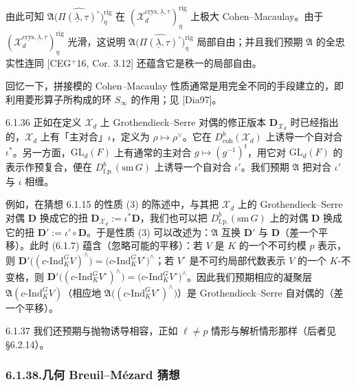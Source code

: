 由此可知 $\mathfrak A\bigl(\widehat{\Pi(\underline\lambda,\tau)^\circ}\bigr)^{\mathrm{rig}}_\eta$ 在 $(\mathcal X_d^{\mathrm{crys},\underline\lambda,\tau})^{\mathrm{rig}}_\eta$ 上极大 Cohen--Macaulay。由于 $(\mathcal X_d^{\mathrm{crys},\underline\lambda,\tau})^{\mathrm{rig}}_\eta$ 光滑，这说明 $\mathfrak A\bigl(\widehat{\Pi(\underline\lambda,\tau)^\circ}\bigr)^{\mathrm{rig}}_\eta$ 局部自由；并且我们预期 $\mathfrak A$ 的全忠实性连同 [CEG$^+$16, Cor. 3.12] 还蕴含它是秩一的局部自由。

回忆一下，拼接模的 Cohen--Macaulay 性质通常是用完全不同的手段建立的，即利用菱形算子所构成的环 $S_\infty$ 的作用；见 [Dia97]。

\begin{rem}{6.1.36}
正如在定义 $\mathcal X_d$ 上 Grothendieck--Serre 对偶的修正版本 $\mathbf D_{\mathcal X_d}$ 时已经指出的，$\mathcal X_d$ 上有「主对合」$\iota$，定义为 $\rho\mapsto\rho^\vee$。它在 $D^b_{\mathrm{coh}}(\mathcal X_d)$ 上诱导一个自对合 $\iota^*$。另一方面，$\mathrm{GL}_d(F)$ 上有通常的主对合 $g\mapsto(g^{-1})^t$，用它对 $\mathrm{GL}_d(F)$ 的表示作预复合，便在 $D^b_{\mathrm{f.p.}}(\mathrm{sm}\,G)$ 上诱导一个自对合 $\iota'$。我们预期 $\mathfrak A$ 把对合 $\iota'$ 与 $\iota$ 相缠。

例如，在猜想 6.1.15 的性质 (3) 的陈述中，与其把 $\mathcal X_d$ 上的 Grothendieck--Serre 对偶 $\mathbf D$ 换成它的扭 $\mathbf D_{\mathcal X_d}:=\iota^*\mathbf D$，我们也可以把 $D^b_{\mathrm{f.p.}}(\mathrm{sm}\,G)$ 上的对偶 $\mathbf D$ 换成它的扭 $\mathbf D':=\iota'\circ\mathbf D$。于是性质 (3) 可以改述为：$\mathfrak A$ 互换 $\mathbf D'$ 与 $\mathbf D$（差一个平移）。此时 (6.1.7) 蕴含（忽略可能的平移）：若 $V$ 是 $K$ 的一个不可约模 $p$ 表示，则 $\mathbf D'\bigl((c\text{-}\mathrm{Ind}_K^G V)^\wedge\bigr)=\bigl(c\text{-}\mathrm{Ind}_K^G V^\circ\bigr)^\wedge$；若 $V^\circ$ 是不可约局部代数表示 $V$ 的一个 $K$-不变格，则 $\mathbf D'\bigl((c\text{-}\mathrm{Ind}_K^G V^\circ)^\wedge\bigr)=\bigl(c\text{-}\mathrm{Ind}_K^G V^\circ\bigr)^\wedge$。因此我们预期相应的凝聚层 $\mathfrak A(c\text{-}\mathrm{Ind}_K^G V)$（相应地 $\mathfrak A\bigl((c\text{-}\mathrm{Ind}_K^G V^\circ)^\wedge\bigr)$）是 Grothendieck--Serre 自对偶的（差一个平移）。
\end{rem}

\begin{rem}{6.1.37}
我们还预期与抛物诱导相容，正如 $\ell\neq p$ 情形与解析情形那样（后者见 §6.2.14）。
\end{rem}

\subsubsection*{6.1.38.\quad 几何 Breuil--Mézard 猜想}

